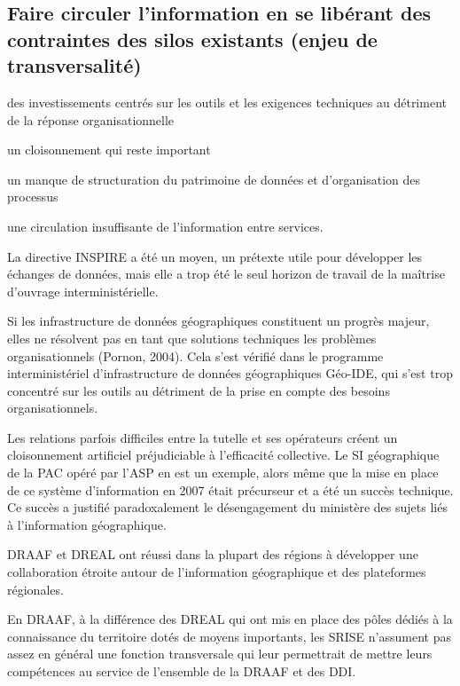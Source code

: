 \subsection[constats:circulations]
{Faire circuler l'information en se libérant des contraintes des silos
existants (enjeu de transversalité)}

\subject{Constats}

{\it

\startitemize[a,packed]

\item des investissements centrés sur les outils et les exigences techniques au
détriment de la réponse organisationnelle

\item un cloisonnement qui reste important

\item un manque de structuration du patrimoine de données et d'organisation des
processus

\item une circulation insuffisante de l'information entre services.

\stopitemize}

La directive INSPIRE a été un moyen, un prétexte utile pour développer les
échanges de données, mais elle a trop été le seul horizon de travail de la
maîtrise d'ouvrage interministérielle.

Si les infrastructure de données géographiques constituent un progrès majeur,
elles ne résolvent pas en tant que solutions techniques les problèmes
organisationnels (Pornon, 2004). Cela s'est vérifié dans le programme
interministériel d'infrastructure de données géographiques Géo-IDE, qui s'est
trop concentré sur les outils au détriment de la prise en compte des besoins
organisationnels.

Les relations parfois difficiles entre la tutelle et ses opérateurs créent un
cloisonnement artificiel préjudiciable à l'efficacité collective. Le SI
géographique de la PAC opéré par l'ASP en est un exemple, alors même que la
mise en place de ce système d'information en 2007 était précurseur et a été un
succès technique. Ce succès a justifié paradoxalement le
désengagement du ministère des sujets liés à l'information géographique.

DRAAF et DREAL ont réussi dans la plupart des régions à
développer une collaboration étroite autour de l'information géographique et
des plateformes régionales.

En DRAAF, à la différence des DREAL qui ont mis en place des pôles
dédiés à la connaissance du territoire dotés de moyens importants, les SRISE
n'assument pas assez en général une fonction transversale qui leur permettrait
de mettre leurs compétences au service de l'ensemble de la DRAAF et des DDI.

